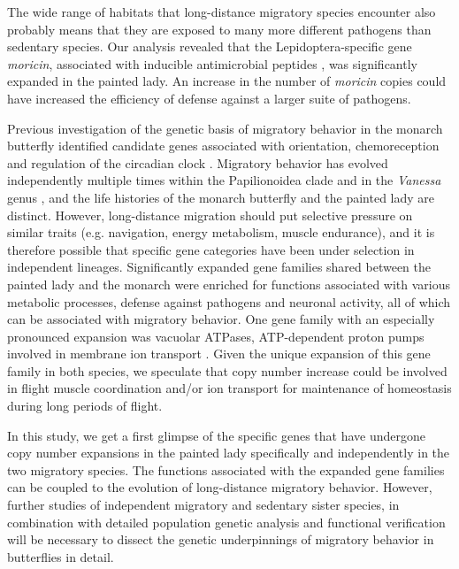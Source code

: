 \documentclass[twocolumn]{bmcart}%
\begin{document}
The wide range of habitats that long-distance migratory species encounter also probably means that they are exposed to many more different pathogens than sedentary species. Our analysis revealed that the Lepidoptera-specific gene \textit{moricin}, associated with inducible antimicrobial peptides \citep{haraMoricinNovelType1995}, was significantly expanded in the painted lady. An increase in the number of \textit{moricin} copies could have increased the efficiency of defense against a larger suite of pathogens.

Previous investigation of the genetic basis of migratory behavior in the monarch butterfly identified candidate genes associated with orientation, chemoreception and regulation of the circadian clock \citep{zhanGeneticsMonarchButterfly2014, zhuDefiningBehavioralMolecular2009}. Migratory behavior has evolved independently multiple times within the Papilionoidea clade \citep{chowdhuryMigrationButterfliesGlobal2021} and in the \textit{Vanessa} genus \citep{wahlbergVagilityVanessaLepidoptera2011}, and the life histories of the monarch butterfly and the painted lady are distinct. However, long-distance migration should put selective pressure on similar traits (e.g. navigation, energy metabolism, muscle endurance), and it is therefore possible that specific gene categories have been under selection in independent lineages. Significantly expanded gene families shared between the painted lady and the monarch were enriched for functions associated with various metabolic processes, defense against pathogens and neuronal activity, all of which can be associated with migratory behavior. One gene family with an especially pronounced expansion was vacuolar ATPases, ATP-dependent proton pumps involved in membrane ion transport \citep{wieczorekVacuolartypeProtonPumps2009}. Given the unique expansion of this gene family in both species, we speculate that copy number increase could be involved in flight muscle coordination and/or ion transport for maintenance of homeostasis during long periods of flight.

In this study, we get a first glimpse of the specific genes that have undergone copy number expansions in the painted lady specifically and independently in the two migratory species. The functions associated with the expanded gene families can be coupled to the evolution of long-distance migratory behavior. However, further studies of independent migratory and sedentary sister species, in combination with detailed population genetic analysis and functional verification will be necessary to dissect the genetic underpinnings of migratory behavior in butterflies in detail.
\end{document}
